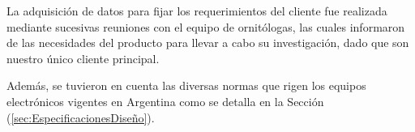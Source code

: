 La adquisición de datos para fijar los requerimientos del cliente fue realizada mediante sucesivas reuniones con el equipo de ornitólogas, las cuales informaron de las necesidades del producto para llevar a cabo su investigación, dado que son nuestro único cliente principal.

Además, se tuvieron en cuenta las diversas normas que rigen los equipos electrónicos vigentes en Argentina como se detalla en la Sección (\ref{sec:EspecificacionesDiseño}). 
